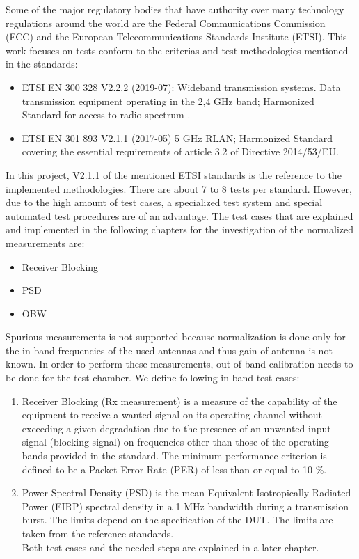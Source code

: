 Some of the major regulatory bodies that have authority over many technology regulations around the world are the Federal Communications Commission (FCC) and the European Telecommunications Standards Institute (ETSI). This work focuses on tests conform to the criterias and test methodologies mentioned in the standards:
\begin{itemize}
	\item ETSI EN 300 328 V2.2.2 (2019-07): Wideband transmission systems. Data transmission equipment operating in the 2,4 GHz band; Harmonized Standard for access to radio spectrum \cite{etsi300328}.

	\item ETSI EN 301 893 V2.1.1 (2017-05) 5 GHz RLAN; Harmonized Standard covering the essential requirements of article 3.2 of Directive 2014/53/EU.
\end{itemize}



In this project, V2.1.1 of the mentioned ETSI standards is the reference to the implemented methodologies. There are about 7 to 8 tests per standard. However, due to the high amount of test cases, a specialized test system and special automated test procedures are of an advantage. The test cases that are explained and implemented in the following chapters for the investigation of the normalized measurements are:
\begin{itemize}
    \item Receiver Blocking
    \item \acf{PSD}
    \item \acf{OBW}
\end{itemize}

Spurious measurements is not supported because normalization is done only for the in band frequencies of the used antennas and thus gain of antenna is not known. In order to perform these measurements, out of band calibration needs to be done for the test chamber. We define following in band test cases:\\

\begin{enumerate}
\item Receiver Blocking (Rx measurement) is a measure of the capability of the equipment to receive a wanted signal on its operating channel without exceeding a given degradation due to the presence of an unwanted input signal (blocking signal) on frequencies other than those of the operating bands provided in the standard. The minimum performance criterion is defined to be a Packet Error Rate (PER) of less than or equal to 10 \%.




\item Power Spectral Density (PSD) is the mean Equivalent Isotropically Radiated Power (EIRP) spectral density in a 1 MHz bandwidth during a transmission burst. The limits depend on the specification of the DUT. The limits are taken from the reference standards.\\
Both test cases and the needed steps are explained in a later chapter.
\end{enumerate}

